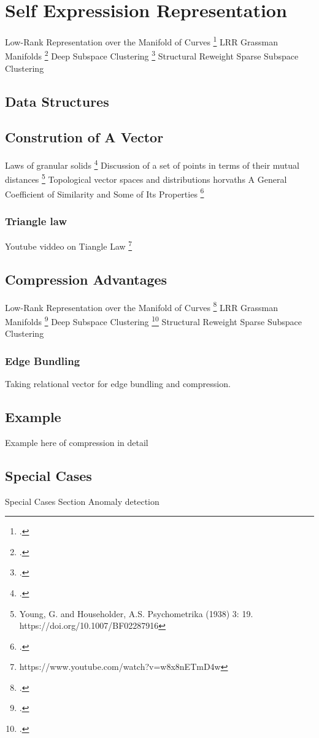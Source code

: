 \section{Self Expressision Representation}
Low-Rank Representation over the Manifold of Curves \footcite{Zhang2016} \newline
LRR Grassman Manifolds \footcite{Yin2015} \newline
Deep Subspace Clustering \footcite{Ian2017} \newline
Structural Reweight Sparse Subspace Clustering
\subsection{Data Structures}
\subsection{Constrution of A Vector}
Laws of granular solids \footcite{McElwaine2011} \newline
Discussion of a set of points in terms of their mutual distances \footnote{Young, G. and  Householder, A.S. Psychometrika (1938) 3: 19. https://doi.org/10.1007/BF02287916} \newline 
Topological vector spaces and distributions horvaths \newline
A General Coefficient of Similarity and Some of Its Properties \footcite{Gower1971} \newline
\subsubsection{Triangle law}
Youtube viddeo on Tiangle Law \footnote{https://www.youtube.com/watch?v=w8x8nETmD4w}


\subsection{Compression Advantages}
Low-Rank Representation over the Manifold of Curves \footcite{Zhang2016} \newline
LRR Grassman Manifolds \footcite{Yin2015} \newline
Deep Subspace Clustering \footcite{Ian2017} \newline
Structural Reweight Sparse Subspace Clustering
\subsubsection{Edge Bundling}
Taking relational vector for edge bundling and compression.

\subsection{Example}
Example here of compression in detail
\subsection{Special Cases}
Special Cases Section\newline
Anomaly detection
